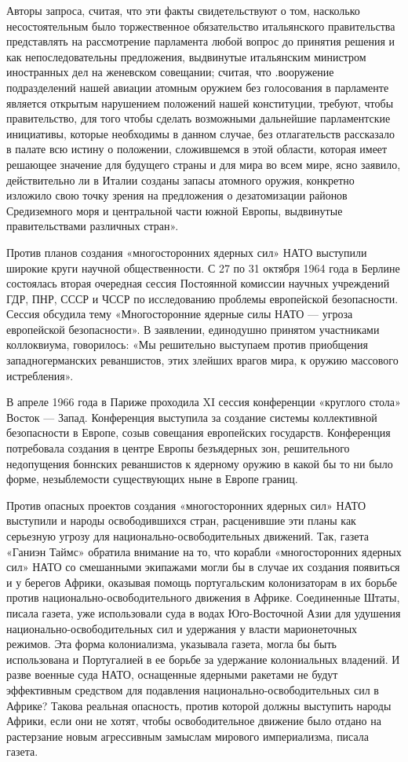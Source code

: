 \documentclass[12pt, a4paper, openany]{book}
\begin{document}
	Авторы запроса, считая, что эти факты свидетельствуют о том, насколько несостоятельным было торжественное обязательство итальянского правительства представлять на рассмотрение парламента любой вопрос до принятия решения и как непоследовательны предложения, выдвинутые итальянским министром иностранных дел на женевском совещании; считая, что .вооружение подразделений нашей авиации атомным оружием без голосования в парламенте является открытым нарушением положений нашей конституции, требуют, чтобы правительство, для того чтобы сделать возможными дальнейшие парламентские инициативы, которые необходимы в данном случае, без отлагательств рассказало в палате всю истину о положении, сложившемся в этой области, которая имеет решающее значение для будущего страны и для мира во всем мире, ясно заявило, действительно ли в Италии созданы запасы атомного оружия, конкретно изложило свою точку зрения на предложения о дезатомизации районов Средиземного моря и центральной части южной Европы, выдвинутые правительствами различных стран».
	
	Против планов создания «многосторонних ядерных сил» НАТО выступили широкие круги научной общественности. С 27 по 31 октября 1964 года в Берлине состоялась вторая очередная сессия Постоянной комиссии научных учреждений ГДР, ПНР, СССР и ЧССР по исследованию проблемы европейской безопасности. Сессия обсудила тему «Многосторонние ядерные силы НАТО — угроза европейской безопасности». В заявлении, единодушно принятом участниками коллоквиума, говорилось: «Мы решительно выступаем против приобщения западногерманских реваншистов, этих злейших врагов мира, к оружию массового истребления».
	
	В апреле 1966 года в Париже проходила XI сессия конференции «круглого стола» Восток — Запад. Конференция выступила за создание системы коллективной безопасности в Европе, созыв совещания европейских государств. Конференция потребовала создания в центре Европы безъядерных зон, решительного недопущения боннских реваншистов к ядерному оружию в какой бы то ни было форме, незыблемости существующих ныне в Европе границ.
	
	Против опасных проектов создания «многосторонних ядерных сил» НАТО выступили и народы освободившихся стран, расценившие эти планы как серьезную угрозу для национально-освободительных движений. Так, газета «Ганиэн Таймс» обратила внимание на то, что корабли «многосторонних ядерных сил» НАТО со смешанными экипажами могли бы в случае их создания появиться и у берегов Африки, оказывая помощь португальским колонизаторам в их борьбе против национально-освободительного движения в Африке. Соединенные Штаты, писала газета, уже использовали суда в водах Юго-Восточной Азии для удушения национально-освободительных сил и удержания у власти марионеточных режимов. Эта форма колониализма, указывала газета, могла бы быть использована и Португалией в ее борьбе за удержание колониальных владений. И разве военные суда НАТО, оснащенные ядерными ракетами не будут эффективным средством для подавления национально-освободительных сил в Африке? Такова реальная опасность, против которой должны выступить народы Африки, если они не хотят, чтобы освободительное движение было отдано на растерзание новым агрессивным замыслам мирового империализма, писала газета.
	
\end{document}
